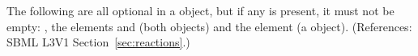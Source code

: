 The following are all optional in a \Reaction object, but if any is
present, it must not be empty: \KineticLaw, the elements
 and  (both
\ListOfSpeciesReferences objects) and the element 
(a \ListOfModifierSpeciesReferences object).  (References: SBML L3V1
Section~\ref{sec:reactions}.)

